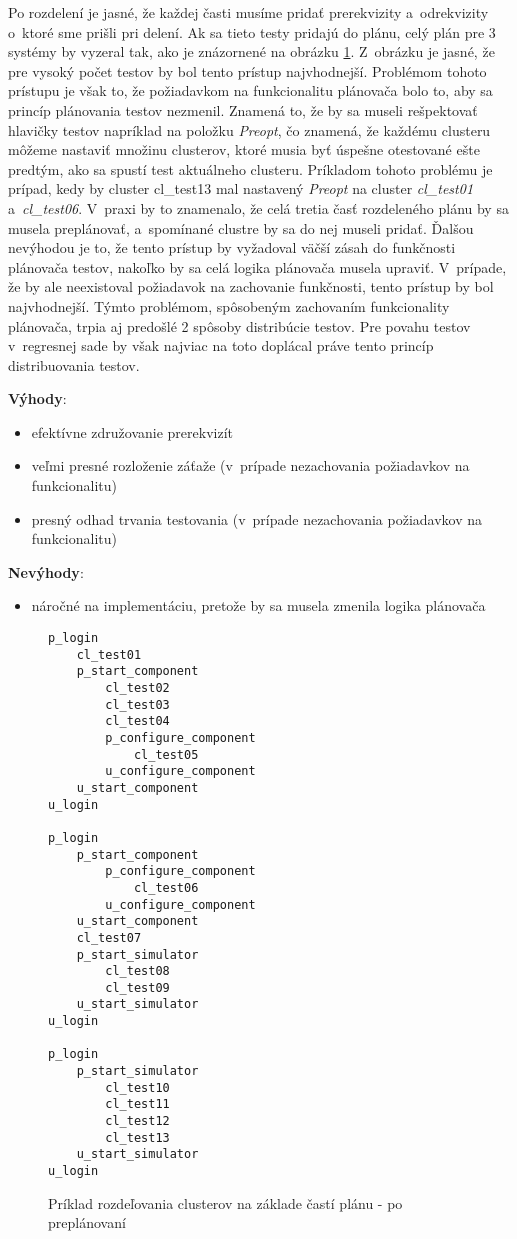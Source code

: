 Po rozdelení je jasné, že každej časti musíme pridať prerekvizity a~odrekvizity
o~ktoré sme prišli pri delení. Ak sa tieto testy pridajú do plánu, celý plán
pre 3 systémy by vyzeral tak, ako je znázornené na obrázku \ref{fig:distribucia_casti_po}.
Z~obrázku je jasné, že pre vysoký počet testov by bol tento prístup najvhodnejší.
Problémom tohoto prístupu je však to, že požiadavkom na funkcionalitu plánovača bolo to,
aby sa princíp plánovania testov nezmenil. Znamená to, že by sa museli rešpektovať hlavičky testov
napríklad na položku \emph{Preopt}, čo znamená, že každému clusteru môžeme nastaviť množinu clusterov,
ktoré musia byť úspešne otestované ešte predtým, ako sa spustí test aktuálneho clusteru.
Príkladom tohoto problému je prípad, kedy by cluster cl\_test13 mal nastavený 
\emph{Preopt} na cluster \emph{cl\_test01} a~\emph{cl\_test06}.
V~praxi by to znamenalo, že celá tretia časť rozdeleného plánu by sa musela preplánovať,
a~spomínané clustre by sa do nej museli pridať. Ďalšou nevýhodou je to, že tento prístup by
vyžadoval väčší zásah do funkčnosti plánovača testov, nakoľko by sa celá logika plánovača musela upraviť.
V~prípade, že by ale neexistoval požiadavok na zachovanie funkčnosti, tento prístup by bol najvhodnejší.
Týmto problémom, spôsobeným zachovaním funkcionality plánovača, trpia aj predošlé 2 spôsoby distribúcie testov. 
Pre povahu testov v~regresnej sade by však najviac na toto doplácal práve tento princíp distribuovania testov.  

\noindent \textbf{Výhody}:
\begin{itemize}
\item efektívne združovanie prerekvizít
\item veľmi presné rozloženie záťaže (v~prípade nezachovania požiadavkov na funkcionalitu)
\item presný odhad trvania testovania (v~prípade nezachovania požiadavkov na funkcionalitu)
\end{itemize} 

\noindent \textbf{Nevýhody}:
\begin{itemize}
\item náročné na implementáciu, pretože by sa musela zmenila logika plánovača
\end{itemize}

\begin{figure}[h]
\begin{lstlisting}
p_login
    cl_test01
    p_start_component
        cl_test02
        cl_test03
        cl_test04
        p_configure_component
            cl_test05
        u_configure_component
    u_start_component
u_login

p_login
    p_start_component
        p_configure_component
            cl_test06
        u_configure_component
    u_start_component
    cl_test07
    p_start_simulator
        cl_test08
        cl_test09
    u_start_simulator
u_login

p_login
    p_start_simulator
        cl_test10
        cl_test11
        cl_test12
        cl_test13
    u_start_simulator
u_login
\end{lstlisting}
\caption{Príklad rozdeľovania clusterov na základe častí plánu - po preplánovaní}
\label{fig:distribucia_casti_po}
\end{figure}
 

